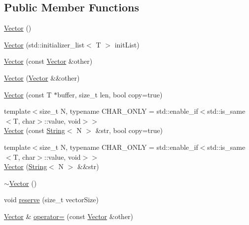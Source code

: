 \subsection*{Public Member Functions}
\begin{DoxyCompactItemize}
\item 
\mbox{\hyperlink{class_concept_1_1_vector_a111960a70fa8b29a66ce1549039587d5}{Vector}} ()
\item 
\mbox{\hyperlink{class_concept_1_1_vector_a0fa645743cfbf3f3228743390ab30ddc}{Vector}} (std\+::initializer\+\_\+list$<$ T $>$ init\+List)
\item 
\mbox{\hyperlink{class_concept_1_1_vector_af9fdc77be6f6efa6c5bae8c565c32c1a}{Vector}} (const \mbox{\hyperlink{class_concept_1_1_vector}{Vector}} \&other)
\item 
\mbox{\hyperlink{class_concept_1_1_vector_a23dd7da897297e5b69f1eefc55815cc0}{Vector}} (\mbox{\hyperlink{class_concept_1_1_vector}{Vector}} \&\&other)
\item 
\mbox{\hyperlink{class_concept_1_1_vector_ac2d544db8d0f9ebbd8802d0666ad930a}{Vector}} (const T $\ast$buffer, size\+\_\+t len, bool copy=true)
\item 
{\footnotesize template$<$size\+\_\+t N, typename C\+H\+A\+R\+\_\+\+O\+N\+LY  = std\+::enable\+\_\+if$<$std\+::is\+\_\+same$<$\+T, char$>$\+::value, void$>$$>$ }\\\mbox{\hyperlink{class_concept_1_1_vector_af46219c89ed3a789fb78db51b0ec7639}{Vector}} (const \mbox{\hyperlink{class_concept_1_1_string}{String}}$<$ N $>$ \&str, bool copy=true)
\item 
{\footnotesize template$<$size\+\_\+t N, typename C\+H\+A\+R\+\_\+\+O\+N\+LY  = std\+::enable\+\_\+if$<$std\+::is\+\_\+same$<$\+T, char$>$\+::value, void$>$$>$ }\\\mbox{\hyperlink{class_concept_1_1_vector_a69f43693d96addb57df7226512891c01}{Vector}} (\mbox{\hyperlink{class_concept_1_1_string}{String}}$<$ N $>$ \&\&str)
\item 
\mbox{\hyperlink{class_concept_1_1_vector_a196f6eef1b0d3c04955d71d597e37c6f}{$\sim$\+Vector}} ()
\item 
void \mbox{\hyperlink{class_concept_1_1_vector_a5d08a1e6b61f98f85076646d06ba8640}{reserve}} (size\+\_\+t vector\+Size)
\item 
\mbox{\hyperlink{class_concept_1_1_vector}{Vector}} \& \mbox{\hyperlink{class_concept_1_1_vector_a0ea691819713d696baa31ddba1240f13}{operator=}} (const \mbox{\hyperlink{class_concept_1_1_vector}{Vector}} \&other)
\item 

\end{DoxyCompactItemize}
